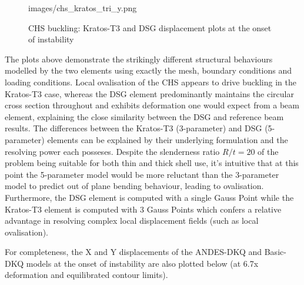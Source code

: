 \begin{figure}[H]
{		{images/chs_kratos_tri_y.png}}
	\caption{\label{chs buckling pics1}CHS buckling: Kratos-T3 and DSG displacement plots at the onset of instability}
\end{figure}

The plots above demonstrate the strikingly different structural behaviours modelled by the two elements using exactly the mesh, boundary conditions and loading conditions. Local ovalisation of the CHS appears to drive buckling in the Kratos-T3 case, whereas the DSG element predominantly maintains the circular cross section throughout and exhibits deformation one would expect from a beam element, explaining the close similarity between the DSG and reference beam results. The differences between the Kratos-T3 (3-parameter) and DSG (5-parameter) elements can be explained by their underlying formulation and the resolving power each posseses. Despite the slenderness ratio $R/t = 20$ of the problem being suitable for both thin and thick shell use, it's intuitive that at this point the 5-parameter model would be more reluctant than the 3-parameter model to predict out of plane bending behaviour, leading to ovalisation. Furthermore, the DSG element is computed with a single Gauss Point while the Kratos-T3 element is computed with 3 Gauss Points which confers a relative advantage in resolving complex local displacement fields (such as local ovalisation).

For completeness, the X and Y displacements of the ANDES-DKQ and Basic-DKQ models at the onset of instability are also plotted below (at 6.7x deformation and equilibrated contour limits).

